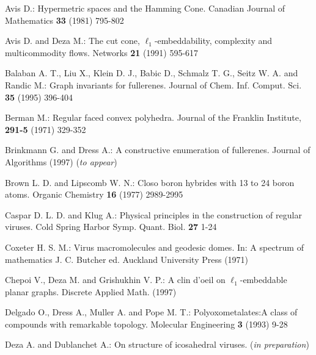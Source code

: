 \begin{thebibliography}{99}

Avis D.:
Hypermetric spaces and the Hamming Cone.
Canadian Journal of Mathematics {\bf 33} (1981) 795-802
\vspace{-3mm}

Avis D. and Deza M.:
The cut cone, $\ell_1$-embeddability, complexity and multicommodity flows.
Networks {\bf 21} (1991) 595-617
\vspace{-3mm}

Balaban A. T., Liu X., Klein D. J., Babic D., Schmalz T. G., Seitz W. A. and Randic M.: 
Graph invariants for fullerenes. 
Journal of Chem. Inf. Comput. Sci. {\bf 35} (1995) 396-404 
\vspace{-3mm}

Berman M.:
Regular faced convex polyhedra. 
Journal of the Franklin Institute, {\bf 291-5} (1971) 329-352
\vspace{-3mm}

Brinkmann G. and Dress A.:
A constructive enumeration of fullerenes.
Journal of Algorithms (1997) ({\em to appear})
\vspace{-3mm}

Brown L. D. and Lipscomb W. N.:
Closo boron hybrides with 13 to 24 boron atoms.
Organic Chemistry {\bf 16} (1977) 2989-2995
\vspace{-3mm}

Caspar D. L. D. and Klug A.:
Physical principles in the construction of regular viruses. 
Cold Spring Harbor Symp. Quant. Biol. {\bf 27} 1-24
\vspace{-3mm}

Coxeter H. S. M.:
Virus macromolecules and geodesic domes.
In: A spectrum of mathematics
J. C. Butcher ed. Auckland University Press (1971)
\vspace{-3mm}

Chepoi V., Deza M. and Grishukhin V. P.:
A clin d'oeil on $\ell_1$-embeddable planar graphs.
Discrete Applied Math. (1997) 
\vspace{-3mm}

Delgado O., Dress A., Muller A. and Pope M. T.: 
Polyoxometalates:A class of compounds with remarkable topology. 
Molecular Engineering {\bf 3} (1993) 9-28 
\vspace{-3mm}

Deza A. and Dublanchet A.:
On structure of icosahedral viruses.
({\it in preparation}) 
\vspace{-3mm}
 

\end{thebibliography}
